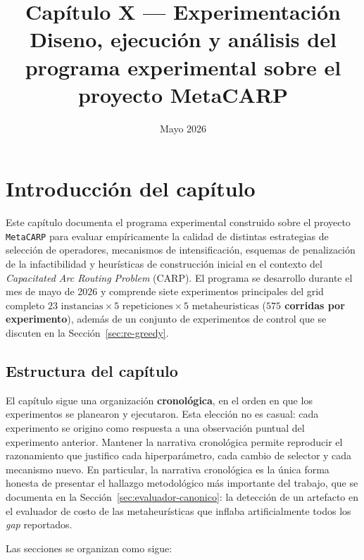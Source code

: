 \documentclass[11pt,a4paper]{article}
\title{\textbf{Capítulo X --- Experimentación}\\[6pt]
\large Diseno, ejecución y análisis del programa experimental sobre el
proyecto MetaCARP}
\author{}
\date{Mayo 2026}
\theoremstyle{definition}
\theoremstyle{remark}
\begin{document}
\maketitle
\tableofcontents
\newpage

\section{Introducción del capítulo}

Este capítulo documenta el programa experimental construido sobre el
proyecto \texttt{MetaCARP} para evaluar empíricamente la calidad de
distintas estrategias de selección de operadores, mecanismos de
intensificación, esquemas de penalización de la infactibilidad y
heurísticas de construcción inicial en el contexto del
\emph{Capacitated Arc Routing Problem} (CARP). El programa se
desarrollo durante el mes de mayo de 2026 y comprende siete
experimentos principales del grid completo $23\text{ instancias} \times
5\text{ repeticiones} \times 5\text{ metaheuristicas}$ (\textbf{$575$
corridas por experimento}), además de un conjunto de experimentos de
control que se discuten en la Sección~\ref{sec:re-greedy}.

\subsection{Estructura del capítulo}

El capítulo sigue una organización \textbf{cronológica}, en el orden en
que los experimentos se planearon y ejecutaron. Esta elección no es
casual: cada experimento se origino como respuesta a una observación
puntual del experimento anterior. Mantener la narrativa cronológica
permite reproducir el razonamiento que justifico cada hiperparámetro,
cada cambio de selector y cada mecanismo nuevo. En particular, la
narrativa cronológica es la única forma honesta de presentar el
hallazgo metodológico más importante del trabajo, que se documenta en
la Sección~\ref{sec:evaluador-canonico}: la detección de un artefacto
en el evaluador de costo de las metaheurísticas que inflaba
artificialmente todos los \emph{gap} reportados.

Las secciones se organizan como sigue:
\end{document}
